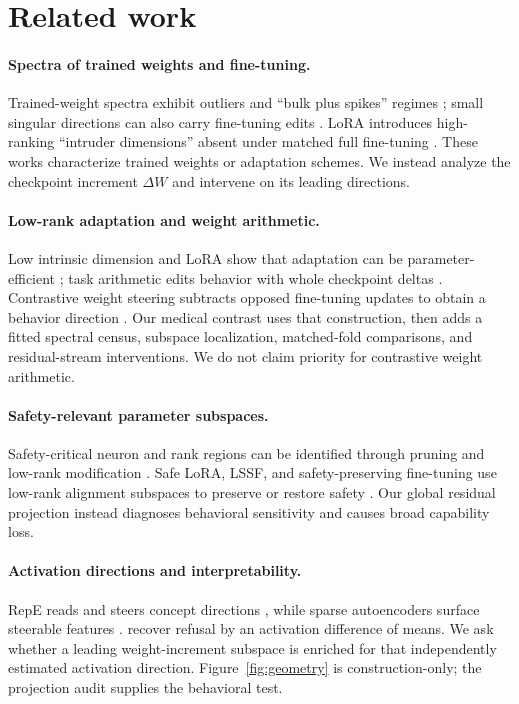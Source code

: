 \section{Related work}
\label{sec:related}

\paragraph{Spectra of trained weights and fine-tuning.}
Trained-weight spectra exhibit outliers and ``bulk plus spikes'' regimes
\citep{martin2021}; small singular directions can also carry fine-tuning edits
\citep{staats2024small}. LoRA introduces high-ranking ``intruder dimensions''
absent under matched full fine-tuning \citep{shuttleworth2025lora}. These works
characterize trained weights or adaptation schemes. We instead analyze the
checkpoint increment $\Delta W$ and intervene on its leading directions.

\paragraph{Low-rank adaptation and weight arithmetic.}
Low intrinsic dimension and LoRA show that adaptation can be
parameter-efficient \citep{aghajanyan2021,hu2022lora}; task arithmetic edits
behavior with whole checkpoint deltas
\citep{ilharco2023task,ortizjimenez2023task}. Contrastive weight steering
subtracts opposed fine-tuning updates to obtain a behavior direction
\citep{fierro2026weight}. Our medical contrast uses that construction, then adds
a fitted spectral census, subspace localization, matched-fold comparisons, and
residual-stream interventions. We do not claim priority for contrastive weight
arithmetic.

\paragraph{Safety-relevant parameter subspaces.}
Safety-critical neuron and rank regions can be identified through pruning and
low-rank modification \citep{wei2024brittleness}. Safe LoRA, LSSF, and
safety-preserving fine-tuning use low-rank alignment subspaces to preserve or
restore safety \citep{hsu2024safelora,zhou2025lssf,zhang2026preserving}. Our
global residual projection instead diagnoses behavioral sensitivity and causes
broad capability loss.

\paragraph{Activation directions and interpretability.}
RepE reads and steers concept directions \citep{zou2023repe}, while sparse
autoencoders surface steerable features \citep{templeton2024scaling}.
\citet{arditi2024} recover refusal by an activation difference of means. We ask
whether a leading weight-increment subspace is enriched for that independently
estimated activation direction. Figure~\ref{fig:geometry} is construction-only;
the projection audit supplies the behavioral test.

